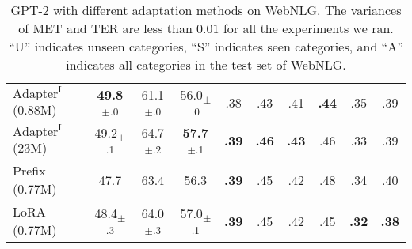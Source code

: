 \documentclass{article} %
\begin{document}
\begin{table}[h]
\begin{tabular}{l|ccc|ccc|ccc}
$\text{Adapter}^{\text{L}}$ (0.88M)  & \textbf{49.8}\textsubscript{$\pm$.0}  & 61.1\textsubscript{$\pm$.0}           & 56.0\textsubscript{$\pm$.0}           & .38           & .43           & .41           & \textbf{.44}  & .35           &  .39 \\
$\text{Adapter}^{\text{L}}$ (23M)   & 49.2\textsubscript{$\pm$.1}           & 64.7\textsubscript{$\pm$.2}           & \textbf{57.7}\textsubscript{$\pm$.1}  & \textbf{.39}  & \textbf{.46}  & \textbf{.43}  & .46           & .33           &  .39 \\
Prefix (0.77M)                      & 47.7                                  & 63.4                                  & 56.3                                  & \textbf{.39}  & .45           & .42           & .48           & .34           & .40 \\
LoRA (0.77M)                        & 48.4\textsubscript{$\pm$.3}           & 64.0\textsubscript{$\pm$.3}           & 57.0\textsubscript{$\pm$.1}           & \textbf{.39}  & .45           & .42           & .45           & \textbf{.32}  & \textbf{.38} \\
\bottomrule
\end{tabular}
\caption{GPT-2 with different adaptation methods on WebNLG. The variances of MET and TER are less than $0.01$ for all the experiments we ran. ``U'' indicates unseen categories, ``S'' indicates seen categories, and ``A'' indicates all categories in the test set of WebNLG.}
\label{tab:gpt2_ft_webnlg}
\end{table}
\end{document}
